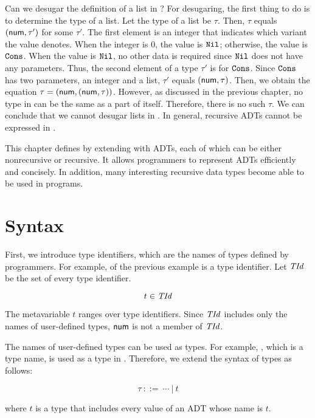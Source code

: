 Can we desugar the definition of a list in \plang? For desugaring, the first
thing to do is to determine the type of a list. Let the type of a list be
$\tau$. Then, $\tau$ equals $(\textsf{num}, \tau')$ for some $\tau'$. The first element is an integer that
indicates which variant the value denotes. When the integer is $0$, the value is
$\texttt{Nil}$; otherwise, the value is $\texttt{Cons}$. When the value is
$\texttt{Nil}$, no other data is required since $\texttt{Nil}$ does not have any
parameters. Thus, the second element of a type $\tau'$ is for $\texttt{Cons}$. Since
$\texttt{Cons}$ has two parameters, an integer and a list, $\tau'$ equals
$(\textsf{num},\tau)$. Then, we obtain the equation $\tau=(\textsf{num},(\textsf{num},\tau))$.
However, as discussed in the previous chapter, no type in \plang can be the same
as a part of itself. Therefore, there is no such $\tau$. We can conclude that we
cannot desugar lists in \plang. In general, recursive ADTs cannot be expressed
in \plang.

This chapter defines \lang by extending \plang{} with ADTs, each of which can be
either nonrecursive or recursive. It allows programmers to represent ADTs
efficiently and concisely. In addition, many interesting recursive data types
become able to be used in programs.

\section{Syntax}

First, we introduce type identifiers, which are the names of types defined by
programmers. For example,
 of the previous example is a type identifier. Let $\mbox{\emph{TId}}$ be
the set of every type identifier.

\[ t \in \mbox{\emph{TId}} \]

The metavariable $t$ ranges over type identifiers. Since $\mbox{\emph{TId}}$ includes only
the names of user-defined types, $\textsf{num}$ is not a member of $\mbox{\emph{TId}}$.

The names of user-defined types can be used as types. For example, ,
which is a type name, is used as a type in .
Therefore, we extend the syntax of types as follows:

\[ \tau \ ::= \ \cdots\ |\  t \]

where $t$ is a type that includes every value of an ADT whose name is $t$.


